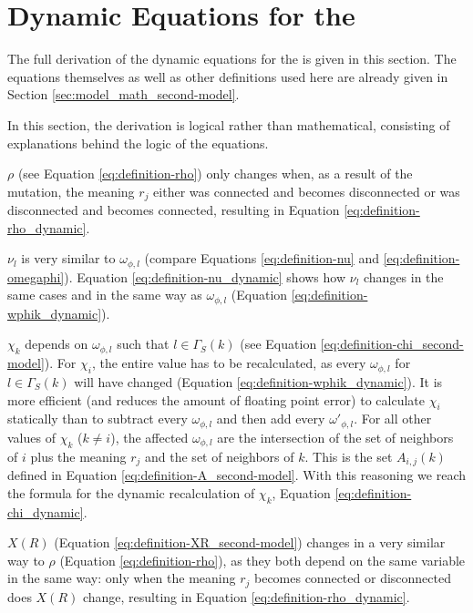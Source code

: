 \section{Dynamic Equations for the \secondmodel{}}
\label{sec:app_formulae_dynamic-equations_second-model}

The full derivation of the dynamic equations for the \secondmodel{} is given in this section.
The equations themselves as well as other definitions used here are already given in Section \ref{sec:model_math_second-model}.

In this section, the derivation is logical rather than mathematical, consisting of explanations behind the logic of the equations.

$\rho$ (see Equation \eqref{eq:definition-rho}) only changes when, as a result of the mutation, the meaning $r_j$ either was connected and becomes disconnected or was disconnected and becomes connected, resulting in Equation \eqref{eq:definition-rho_dynamic}.

$\nu_l$ is very similar to $\omega_{\phi,l}$ (compare Equations \eqref{eq:definition-nu} and \eqref{eq:definition-omegaphi}).
Equation \eqref{eq:definition-nu_dynamic} shows how $\nu_l$ changes in the same cases and in the same way as $\omega_{\phi,l}$ (Equation \eqref{eq:definition-wphik_dynamic}).

$\chi_k$ depends on  $\omega_{\phi,l}$ such that $l \in \Gamma_S(k)$ (see Equation \eqref{eq:definition-chi_second-model}).
For $\chi_i$, the entire value has to be recalculated, as every $\omega_{\phi,l}$ for $l \in \Gamma_S(k)$ will have changed (Equation \eqref{eq:definition-wphik_dynamic}).
It is more efficient (and reduces the amount of floating point error) to calculate $\chi_i$ statically than to subtract every $\omega_{\phi,l}$ and then add every $\omega'_{\phi,l}$.
For all other values of $\chi_k$ ($k \neq i$), the affected $\omega_{\phi,l}$ are the intersection of the set of neighbors of $i$ plus the meaning $r_j$ and the set of neighbors of $k$. This is the set $A_{i,j}(k)$ defined in Equation \eqref{eq:definition-A_second-model}. With this reasoning we reach the formula for the dynamic recalculation of $\chi_k$, Equation \eqref{eq:definition-chi_dynamic}.

$X(R)$ (Equation \eqref{eq:definition-XR_second-model}) changes in a very similar way to $\rho$ (Equation \eqref{eq:definition-rho}), as they both depend on the same variable in the same way: only when the meaning $r_j$ becomes connected or disconnected does $X(R)$ change, resulting in Equation \eqref{eq:definition-rho_dynamic}.

